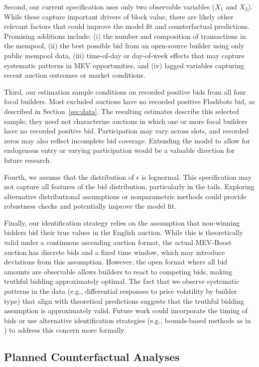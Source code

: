 \documentclass[12pt,reqno]{amsart}
\begin{document}
Second, our current specification uses only two observable variables ($X_1$ and $X_2$). While these capture important drivers of block value, there are likely other relevant factors that could improve the model fit and counterfactual predictions. Promising additions include: (i) the number and composition of transactions in the mempool, (ii) the best possible bid from an open-source builder using only public mempool data, (iii) time-of-day or day-of-week effects that may capture systematic patterns in MEV opportunities, and (iv) lagged variables capturing recent auction outcomes or market conditions.

Third, our estimation sample conditions on recorded positive bids from all four focal builders. Most excluded auctions have no recorded positive Flashbots bid, as described in Section~\ref{sec:data}. The resulting estimates describe this selected sample; they need not characterize auctions in which one or more focal builders have no recorded positive bid. Participation may vary across slots, and recorded zeros may also reflect incomplete bid coverage. Extending the model to allow for endogenous entry or varying participation would be a valuable direction for future research.

Fourth, we assume that the distribution of $\epsilon$ is lognormal. This specification may not capture all features of the bid distribution, particularly in the tails. Exploring alternative distributional assumptions or nonparametric methods could provide robustness checks and potentially improve the model fit.

Finally, our identification strategy relies on the assumption that non-winning bidders bid their true values in the English auction. While this is theoretically valid under a continuous ascending auction format, the actual MEV-Boost auction has discrete bids and a fixed time window, which may introduce deviations from this assumption. However, the open format where all bid amounts are observable allows builders to react to competing bids, making truthful bidding approximately optimal. The fact that we observe systematic patterns in the data (e.g., differential responses to price volatility by builder type) that align with theoretical predictions suggests that the truthful bidding assumption is approximately valid. Future work could incorporate the timing of bids or use alternative identification strategies (e.g., bounds-based methods as in \cite{haile2003inference}) to address this concern more formally.

\subsection{Planned Counterfactual Analyses}
\end{document}
